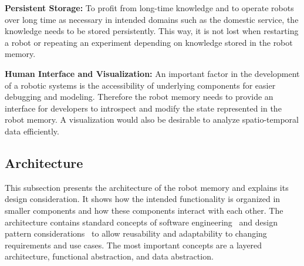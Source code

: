 \documentclass[a4paper,11pt]{article}
\begin{document}
\smallskip
\textbf{Persistent Storage:} To profit from long-time knowledge and to
operate robots over long time as necessary in intended domains
such as the domestic service, the knowledge needs to be stored
persistently. This way, it is not lost when restarting a robot or
repeating an experiment depending on knowledge stored in the robot
memory.

\smallskip
\textbf{Human Interface and Visualization:} An important factor in the
development of a robotic systems is the accessibility of underlying
components for easier debugging and modeling. Therefore the robot
memory needs to provide an interface for developers to introspect and
modify the state represented in the robot memory. A visualization
would also be desirable to analyze spatio-temporal data efficiently.


\subsection{Architecture}
\label{sec:arch}
This subsection presents the architecture of the robot memory and
explains its design consideration. It shows how the intended
functionality is organized in smaller components and how these
components interact with each other. The architecture
contains standard concepts of software
engineering~\cite{software-architecture} and design pattern
considerations~\cite{design-patterns} to allow reusability and
adaptability to changing requirements and use cases. The most
important concepts are a layered architecture, functional abstraction,
and data abstraction.
\end{document}
